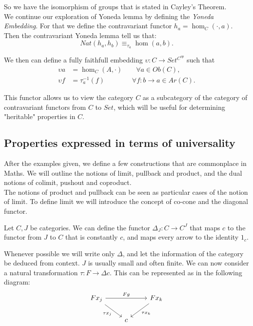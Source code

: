 So we have the isomorphism of groups that is stated in Cayley's Theorem.\\



We continue our exploration of Yoneda lemma by defining the \emph{Yoneda Embedding}. For that we define the contravariant functor $h_a = \hom_C(\cdot, a)$. Then the contravariant Yoneda lemma tell us that:
$$Nat(h_a,h_b) \equiv_{\tau_a} \hom(a,b).$$

We then can define a fully faithfull embedding $\upsilon: C \to Set^{C^{op}}$ such that 
\begin{align*}
  \upsilon a  &= \hom_C(A, \cdot)\qquad \forall a \in Ob(C), \\
  \upsilon f &= \tau_a^{-1} (f)\qquad\qquad \forall f:b\to a\in Ar(C).
\end{align*}

This functor allows us to view the category $C$ as a subcategory of the category of contravariant functors from $C$ to $Set$, which will be useful for determining "heritable" properties in $C$.
\subsection{Properties expressed in terms of universality}

  After the examples given, we define a few constructions that are commonplace in Maths. We will outline the notions of limit, pullback and product, and the dual notions of colimit, pushout and coproduct.\\

  The notions of product and pullback can be seen as particular cases of the notion of limit. To define limit we will introduce the concept of co-cone and the diagonal functor. \\

  \begin{definition}
    Let $C,J$ be categories. We can define the functor $\Delta_J: C \to C^J$ that maps $c$ to the functor from $J$ to $C$ that is constantly $c$, and maps every arrow to the identity $1_c$. 
  \end{definition}

  Whenever possible we will write only $\Delta$, and let the information of the category be deduced from context. $J$ is usually small and often finite. We can now consider a natural transformation $\tau: F \to \Delta c$. This can be represented as in the following diagram:
    \[
      \begin{tikzcd}
        Fx_j\arrow[swap]{dr}{\tau x_j}\arrow{rr}{F g} &
        & Fx_k\arrow{dl}{\tau x_k}\\
        & c&
      \end{tikzcd}
    \]

